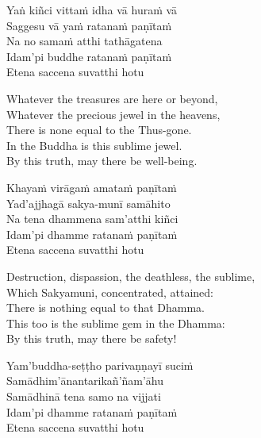 \begin{pali-hang-continued}
  Yaṅ kiñci vittaṁ idha vā huraṁ vā\\
  Saggesu vā yaṁ ratanaṁ paṇītaṁ\\
  Na no samaṁ atthi tathāgatena\\
  Idam'pi buddhe ratanaṁ paṇītaṁ\\
  Etena saccena suvatthi hotu
\end{pali-hang-continued}

\begin{english-verses}
  Whatever the treasures are here or beyond,\\
  Whatever the precious jewel in the heavens,\\
  There is none equal to the Thus-gone.\\
  In the Buddha is this sublime jewel.\\
  By this truth, may there be well-being.
\end{english-verses}

\begin{pali-hang-continued}
  Khayaṁ virāgaṁ amataṁ paṇītaṁ\\
  Yad'ajjhagā sakya-munī samāhito\\
  Na tena dhammena sam'atthi kiñci\\
  Idam'pi dhamme ratanaṁ paṇītaṁ\\
  Etena saccena suvatthi hotu
\end{pali-hang-continued}

\begin{english-verses}
  Destruction, dispassion, the deathless, the sublime,\\
  Which Sakyamuni, concentrated, attained:\\
  There is nothing equal to that Dhamma.\\
  This too is the sublime gem in the Dhamma:\\
  By this truth, may there be safety!
\end{english-verses}

\begin{pali-hang-continued}
  Yam'buddha-seṭṭho parivaṇṇayī suciṁ\\
  Samādhim'ānantarikañ'ñam'āhu\\
  Samādhinā tena samo na vijjati\\
  Idam'pi dhamme ratanaṁ paṇītaṁ\\
  Etena saccena suvatthi hotu
\end{pali-hang-continued}

